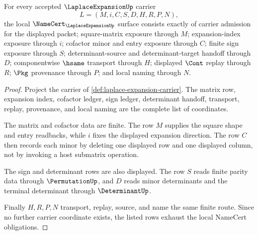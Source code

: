 \begin{theorem}
\label{thm:laplace-expansion-namecert-obligations}
For every accepted $\LaplaceExpansionUp$ carrier
$$
L=(M,i,C,S,D,H,R,P,N),
$$
the local $\NameCert_{\LaplaceExpansionUp}$ surface consists exactly of carrier admission for the displayed packet; square-matrix exposure through $M$; expansion-index exposure through $i$; cofactor minor and entry exposure through $C$; finite sign exposure through $S$; determinant-source and determinant-target handoff through $D$; componentwise $\hsame$ transport through $H$; displayed $\Cont$ replay through $R$; $\Pkg$ provenance through $P$; and local naming through $N$.
\end{theorem}
\begin{proof}
Project the carrier of \autoref{def:laplace-expansion-carrier}. The matrix row, expansion index, cofactor ledger, sign ledger, determinant handoff, transport, replay, provenance, and local naming are the complete list of coordinates.

The matrix and cofactor data are finite. The row $M$ supplies the square shape and entry readbacks, while $i$ fixes the displayed expansion direction. The row $C$ then records each minor by deleting one displayed row and one displayed column, not by invoking a host submatrix operation.

The sign and determinant rows are also displayed. The row $S$ reads finite parity data through $\PermutationUp$, and $D$ reads minor determinants and the terminal determinant through $\DeterminantUp$.

Finally $H,R,P,N$ transport, replay, source, and name the same finite route. Since no further carrier coordinate exists, the listed rows exhaust the local NameCert obligations.
\end{proof}

